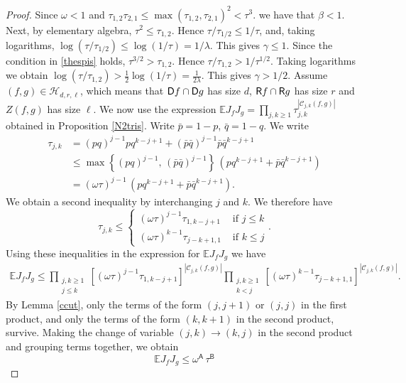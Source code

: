 \documentclass[10pt,a4paper]{amsart}
\def\CC{\mathscr{C}}
\def\E{\mathbb{E}}
\def\HH{\mathscr{H}}
\def\dom{{\sf D}}
\def\ran{{\sf R}}
\begin{document}
\begin{proof}
Since $\omega<1$ and
$\tau_{1,2} \tau_{2,1} \le \max(\tau_{1,2}, \tau_{2,1})^2 < \tau^3$. 
we have that $\beta<1$.
Next, by elementary algebra, $\tau^2 \le \tau_{1,2}$. Hence $\tau/\tau_{1/2}  \le 1/\tau$,
and, taking logarithms, $\log(\tau/\tau_{1/2}) \le \log(1/\tau)=1/\lambda$.
This gives $\gamma \le 1$.
Since the condition in \eqref{thespis} holds, $\tau^{3/2} >\tau_{1,2}$. 
Hence $\tau/\tau_{1,2} >1/\tau^{1/2}$.
Taking logarithms we obtain $\log(\tau/\tau_{1,2}) > \frac12 \log(1/\tau)
=\frac{1}{2\lambda}$.
This gives $\gamma >1/2$.
Assume $(f,g) \in \HH_{d,r,\ell}$, which means that
$\dom f \cap \dom g$ has size $d$, $\ran f \cap \ran g$ has size $r$ 
and $Z(f,g)$ has size $\ell$.
We now use the expression 
$\E J_f J_g=\prod_{j,k \ge 1} \tau_{j,k}^{|\CC_{j,k}(f,g)|}$ obtained in
Proposition \ref{N2tris}.
Write $\bar p = 1-p$, $\bar q = 1-q$.
We write 
\begin{align*}
\tau_{j,k} 
&= (pq)^{j-1} p q^{k-j+1} 
+ (\bar p \bar q)^{j-1}  \bar p  \bar q^{k-j+1} 
\\
&\le \max\left\{(pq)^{j-1},\, (\bar p\bar q)^{j-1}\right\}
\, (p q^{k-j+1} + \bar p \bar q^{k-j+1}) 
\\
& = (\omega \tau)^{j-1} \, (p q^{k-j+1} + \bar p \bar q^{k-j+1}).
\end{align*}
We obtain a second inequality by interchanging $j$ and $k$.
We therefore have
\[
\tau_{j,k} \le \begin{cases}
(\omega \tau)^{j-1} \tau_{1,k-j+1} & \text{ if } j \le k
\\
(\omega \tau)^{k-1} \tau_{j-k+1,1} & \text{ if } k \le j
\end{cases}.
\]
Using these inequalities in the expression for $\E J_f J_g$ we have
\begin{align*}
\E J_f J_g \le
\prod_{\substack{j,k \ge 1\\ j \le k}} 
\left[(\omega \tau)^{j-1} \tau_{1,k-j+1}\right]^{|\CC_{j,k}(f,g)|}
\prod_{\substack{j,k \ge 1\\ k<j}} 
\left[(\omega \tau)^{k-1} \tau_{j-k+1,1}\right]^{|\CC_{j,k}(f,g)|}.
\end{align*}
By Lemma \ref{ccut}, only the terms of the form $(j,j+1)$ or $(j,j)$ 
in the first product, and only the terms of the form $(k,k+1)$ in the second product,
survive. Making the change of variable $(j,k) \to (k,j)$ in the second
product and grouping terms together, we obtain
\begin{equation}
\label{once}
\E J_f J_g \le
\omega^{\mathsf A} \, \tau^{\mathsf B}

\end{equation}
\end{proof}
\end{document}

